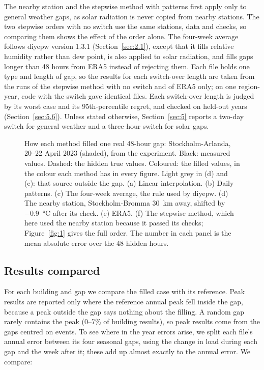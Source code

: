 The nearby station and the stepwise method with patterns first apply only to general weather gaps, as solar radiation is never copied from nearby stations. The two stepwise orders with no switch use the same stations, data and checks, so comparing them shows the effect of the order alone. The four-week average follows diyepw version 1.3.1 (Section~\ref{sec:2.1}), except that it fills relative humidity rather than dew point, is also applied to solar radiation, and fills gaps longer than 48 hours from ERA5 instead of rejecting them. Each file holds one type and length of gap, so the results for each switch-over length are taken from the runs of the stepwise method with no switch and of ERA5 only; on one region-year, code with the switch gave identical files. Each switch-over length is judged by its worst case and its 95th-percentile regret, and checked on held-out years (Section~\ref{sec:5.6}). Unless stated otherwise, Section~\ref{sec:5} reports a two-day switch for general weather and a three-hour switch for solar gaps.

\begin{figure}[tbp]
\centering
{}
\caption{How each method filled one real 48-hour gap: Stockholm-Arlanda, 20--22 April 2023 (shaded), from the experiment. Black: measured values. Dashed: the hidden true values. Coloured: the filled values, in the colour each method has in every figure. Light grey in (d) and (e): that source outside the gap. (a) Linear interpolation. (b) Daily patterns. (c) The four-week average, the rule used by diyepw. (d) The nearby station, Stockholm-Bromma 30~km away, shifted by −0.9~°C after its check. (e) ERA5. (f) The stepwise method, which here used the nearby station because it passed its checks; Figure~\ref{fig:1} gives the full order. The number in each panel is the mean absolute error over the 48 hidden hours.}
\label{fig:6}
\end{figure}

\subsection{Results compared}\label{sec:4.5}

For each building and gap we compare the filled case with its reference. Peak results are reported only where the reference annual peak fell inside the gap, because a peak outside the gap says nothing about the filling. A random gap rarely contains the peak (0--7\% of building results), so peak results come from the gaps centred on events. To see where in the year errors arise, we split each file's annual error between its four seasonal gaps, using the change in load during each gap and the week after it; these add up almost exactly to the annual error. We compare:

